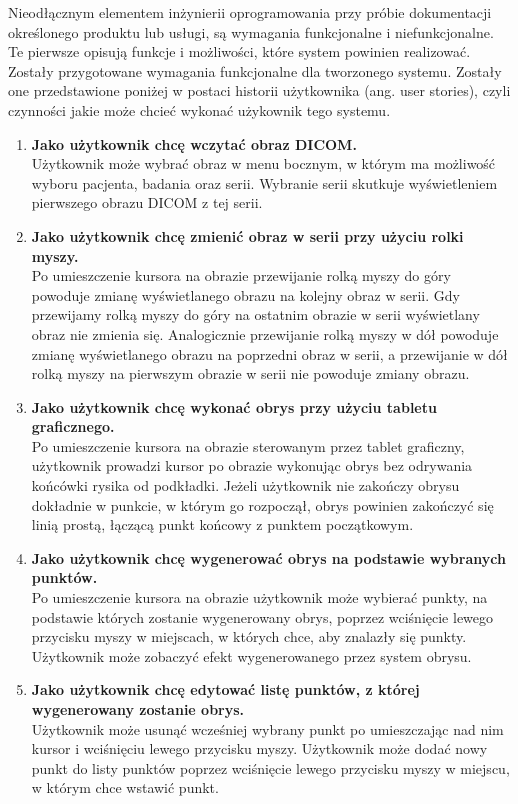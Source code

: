 \documentclass[a4paper,11pt,twoside,openright]{report}
\theoremstyle{definition}
\begin{document}
Nieodłącznym elementem inżynierii oprogramowania przy próbie dokumentacji określonego produktu lub usługi, są wymagania funkcjonalne i niefunkcjonalne. Te pierwsze opisują funkcje i możliwości, które system powinien realizować. Zostały przygotowane wymagania funkcjonalne dla tworzonego systemu. Zostały one przedstawione poniżej w postaci historii użytkownika (ang. user stories), czyli czynności jakie może chcieć wykonać użykownik tego systemu.
\begin{enumerate}
\item \textbf {Jako użytkownik chcę wczytać obraz DICOM.} \\
Użytkownik może wybrać obraz w menu bocznym, w którym ma możliwość wyboru pacjenta, badania oraz serii. Wybranie serii skutkuje wyświetleniem pierwszego obrazu DICOM z tej serii.

\item \textbf {Jako użytkownik chcę zmienić obraz w serii przy użyciu rolki myszy.} \\
Po umieszczenie kursora na obrazie przewijanie rolką myszy do góry powoduje zmianę wyświetlanego obrazu na kolejny obraz w serii. Gdy przewijamy rolką myszy do góry na ostatnim obrazie w serii wyświetlany obraz nie zmienia się. Analogicznie przewijanie rolką myszy w dół powoduje zmianę wyświetlanego obrazu na poprzedni obraz w serii, a przewijanie w dół rolką myszy na pierwszym obrazie w serii nie powoduje zmiany obrazu.

\item \textbf {Jako użytkownik chcę wykonać obrys przy użyciu tabletu graficznego.} \\
Po umieszczenie kursora na obrazie sterowanym przez tablet graficzny, użytkownik prowadzi kursor po obrazie wykonując obrys bez odrywania końcówki rysika od podkładki. Jeżeli użytkownik nie zakończy obrysu dokładnie w punkcie, w którym go rozpoczął, obrys powinien zakończyć się linią prostą, łączącą punkt końcowy z punktem początkowym.

\item \textbf {Jako użytkownik chcę wygenerować obrys na podstawie wybranych punktów.} \\
Po umieszczenie kursora na obrazie użytkownik może wybierać punkty, na podstawie których zostanie wygenerowany obrys, poprzez wciśnięcie lewego przycisku myszy w miejscach, w których chce, aby znalazły się punkty. Użytkownik może zobaczyć efekt wygenerowanego przez system obrysu.

\item \textbf {Jako użytkownik chcę edytować listę punktów, z której wygenerowany zostanie obrys.} \\
Użytkownik może usunąć wcześniej wybrany punkt po umieszczając nad nim kursor i wciśnięciu lewego przycisku myszy. Użytkownik może dodać nowy punkt do listy punktów poprzez wciśnięcie lewego przycisku myszy w miejscu, w którym chce wstawić punkt.


\end{enumerate}
\end{document}

